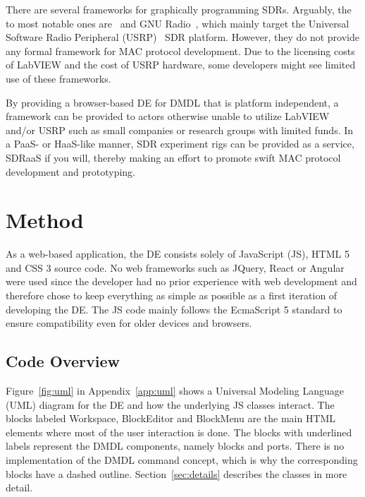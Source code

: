 \documentclass[journal,comsoc]{IEEEtran}
\begin{document}
There are several frameworks for graphically programming SDRs. Arguably, the to most notable
ones are~\cite{labview} and GNU Radio~\cite{gr}, which mainly target the
Universal Software Radio Peripheral (USRP)~\cite{usrp} SDR platform. However, they do not
provide any formal framework for MAC protocol development. Due to the licensing costs of LabVIEW
and the cost of USRP hardware, some developers might see limited use of these frameworks.

By providing a browser-based DE for DMDL that is platform independent, a framework can be provided
to actors otherwise unable to utilize LabVIEW and/or USRP such as small companies or research
groups with limited funds. In a PaaS- or HaaS-like manner, SDR experiment rigs can be provided as a
service, SDRaaS if you will, thereby making an effort to promote swift MAC protocol development and
prototyping.

\section{Method}
As a web-based application, the DE consists solely of JavaScript (JS), HTML 5 and CSS 3 source
code. No web frameworks such as JQuery, React or Angular were used since the developer had no
prior experience with web development and therefore chose to keep everything as simple as possible
as a first iteration of developing the DE. The JS code mainly follows the EcmaScript 5 standard to
ensure compatibility even for older devices and browsers.

\subsection{Code Overview}
Figure~\ref{fig:uml} in Appendix~\ref{app:uml} shows a Universal Modeling Language (UML) diagram
for the DE and how the underlying JS classes interact. The blocks labeled Workspace, BlockEditor
and BlockMenu are the main HTML elements where most of the user interaction is done. The blocks
with underlined labels represent the DMDL components, namely blocks and ports. There is no
implementation of the DMDL command concept, which is why the corresponding blocks have a
dashed outline. Section~\ref{sec:details} describes the classes in more detail.
\end{document}
